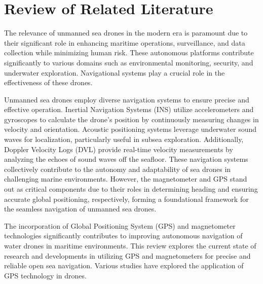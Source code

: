 \chapter{Review of Related Literature}

\vspace{-1cm}

The relevance of unmanned sea drones in the modern era is paramount due to their significant role in enhancing maritime 
operations, surveillance, and data collection while minimizing human risk. These autonomous platforms contribute 
significantly to various domains such as environmental monitoring, security, and underwater exploration. Navigational 
systems play a crucial role in the effectiveness of these drones.

Unmanned sea drones employ diverse navigation systems to ensure precise and effective operation. Inertial Navigation 
Systems (INS) utilize accelerometers and gyroscopes to calculate the drone's position by continuously measuring changes 
in velocity and orientation. Acoustic positioning systems leverage underwater sound waves for localization, particularly 
useful in subsea exploration. Additionally, Doppler Velocity Logs (DVL) provide real-time velocity measurements by 
analyzing the echoes of sound waves off the seafloor. These navigation systems collectively contribute to the autonomy 
and adaptability of sea drones in challenging marine environments. However, the magnetometer and GPS stand out as critical 
components due to their roles in determining heading and ensuring accurate global positioning, respectively, forming a 
foundational framework for the seamless navigation of unmanned sea drones.

The incorporation of Global Positioning System (GPS) and magnetometer technologies significantly contributes to improving
autonomous navigation of water drones in maritime environments. This review explores the current state of research and 
developments in utilizing GPS and magnetometers for precise and reliable open sea navigation. Various studies have explored 
the application of GPS technology in drones.

